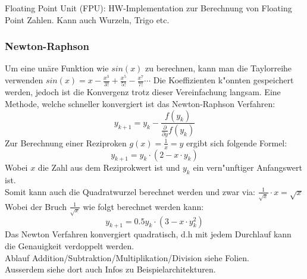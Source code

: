 Floating Point Unit (FPU): HW-Implementation zur Berechnung von Floating Point Zahlen. Kann auch Wurzeln, Trigo etc.\\

\subsubsection{Newton-Raphson}
Um eine unäre Funktion wie $sin(x)$ zu berechnen, kann man die Taylorreihe verwenden $sin(x) = x - \frac{x^3}{3!} + \frac{x^5}{5!} - \frac{x^7}{7!}\cdots$ Die Koeffizienten k"onnten gespeichert werden, jedoch ist die Konvergenz trotz dieser Vereinfachung langsam. 
Eine Methode, welche schneller konvergiert ist das Newton-Raphson Verfahren: 
\begin{equation}
y_{k+1} = y_k - \frac{f(y_k)}{\frac{\partial}{\partial y}f(y_k)}
\end{equation}
Zur Berechnung einer Reziproken $g(x)=\frac{1}{x}=y$ ergibt sich folgende Formel: 
\begin{equation}
y_{k+1} = y_k\cdot (2-x\cdot y_k)
\end{equation}
Wobei $x$ die Zahl aus dem Reziprokwert ist und $y_k$ ein vern"unftiger Anfangswert ist. \\

Somit kann auch die Quadratwurzel berechnet werden und zwar via: $\frac{1}{\sqrt{x}} \cdot x = \sqrt{x}$\\
Wobei der Bruch $\frac{1}{\sqrt{x}}$ wie folgt berechnet werden kann:
\begin{equation}
y_{k+1} = 0.5y_k\cdot (3-x\cdot y_k^2)
\end{equation}
Das Newton Verfahren konvergiert quadratisch, d.h mit jedem Durchlauf kann die Genauigkeit verdoppelt werden.\\
Ablauf Addition/Subtraktion/Multiplikation/Division siehe Folien.\\
Ausserdem siehe dort auch Infos zu Beispielarchitekturen.

